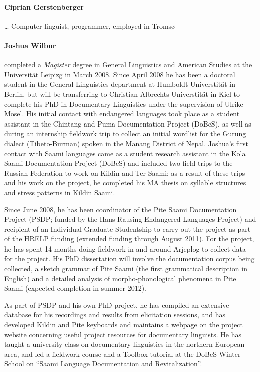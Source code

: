 \documentclass[a4paper,12pt]{article}
\begin{document}
\paragraph{Ciprian Gerstenberger} … Computer linguist, programmer, employed in Tromsø

\paragraph{Joshua Wilbur} completed a \textit{Magister} degree in General Linguistics and American Studies at the Universität Leipizg in March 2008. Since April 2008 he has been a doctoral student in the General Linguistics department at Humboldt-Universtität in Berlin, but will be transferring to Christian-Albrechts-Universtität in Kiel to complete his PhD in Documentary Linguistics under the supervision of Ulrike Mosel. 
His initial contact with endangered languages took place as a student assistant in the Chintang and Puma Documentation Project (DoBeS), as well as during an internship fieldwork trip to collect an initial wordlist for the Gurung dialect (Tibeto-Burman) spoken in the Manang District of Nepal. Joshua's first contact with Saami languages came as a student research assistant in the Kola Saami Documentation Project (DoBeS) and included two field trips to the Russian Federation to work on Kildin and Ter Saami; as a result of these trips and his work on the project, he completed his MA thesis on syllable structures and stress patterns in Kildin Saami.

Since June 2008, he has been coordinator of the Pite Saami Documentation Project (PSDP; funded by the Hans Rausing Endangered Languages Project) and recipient of an Individual Graduate Studentship to carry out the project as part of the HRELP funding (extended funding through August 2011). For the project, he has spent 14 months doing fieldwork in and around Arjeplog to collect data for the project. His PhD dissertation will involve the documentation corpus being collected, a sketch grammar of Pite Saami (the first grammatical description in English) and a detailed analysis of morpho-phonological phenomena in Pite Saami (expected completion in summer 2012).

As part of PSDP and his own PhD project, he has compiled an extensive database for his recordings and results from elicitation sessions, and has developed Kildin and Pite keyboards and maintains a webpage on the project website concerning useful project resources for documentary linguists. He has taught a university class on documentary linguistics in the northern European area, and led a fieldwork course and a Toolbox tutorial at the DoBeS Winter School on “Saami Language Documentation and Revitalization”.
\end{document}

